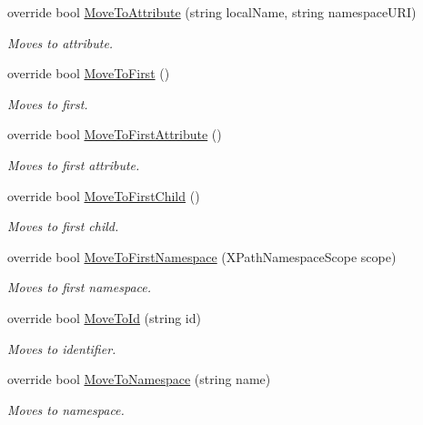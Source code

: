 \begin{DoxyCompactItemize}
override bool \hyperlink{class_html_agility_pack_1_1_html_node_navigator_a6b7fc67311c2ac265885e54c5635541f}{Move\+To\+Attribute} (string local\+Name, string namespace\+U\+RI)
\begin{DoxyCompactList}\small\item\em Moves to attribute. \end{DoxyCompactList}\item 
override bool \hyperlink{class_html_agility_pack_1_1_html_node_navigator_a526c05386cfddeaa487a0faec47b7249}{Move\+To\+First} ()
\begin{DoxyCompactList}\small\item\em Moves to first. \end{DoxyCompactList}\item 
override bool \hyperlink{class_html_agility_pack_1_1_html_node_navigator_a6ccb3234a1eb952d67f616228d27dd12}{Move\+To\+First\+Attribute} ()
\begin{DoxyCompactList}\small\item\em Moves to first attribute. \end{DoxyCompactList}\item 
override bool \hyperlink{class_html_agility_pack_1_1_html_node_navigator_a4ca4c49ada01e73a3ad6a5344d73e6f2}{Move\+To\+First\+Child} ()
\begin{DoxyCompactList}\small\item\em Moves to first child. \end{DoxyCompactList}\item 
override bool \hyperlink{class_html_agility_pack_1_1_html_node_navigator_aa2e0f478c95ac0b68f0f4c0143a999a7}{Move\+To\+First\+Namespace} (X\+Path\+Namespace\+Scope scope)
\begin{DoxyCompactList}\small\item\em Moves to first namespace. \end{DoxyCompactList}\item 
override bool \hyperlink{class_html_agility_pack_1_1_html_node_navigator_a5b647847ecfcedf5701785b1d8263155}{Move\+To\+Id} (string id)
\begin{DoxyCompactList}\small\item\em Moves to identifier. \end{DoxyCompactList}\item 
override bool \hyperlink{class_html_agility_pack_1_1_html_node_navigator_ab7a996c7b03fba88e8c3be79e89bb4aa}{Move\+To\+Namespace} (string name)
\begin{DoxyCompactList}\small\item\em Moves to namespace. \end{DoxyCompactList}\item 

\end{DoxyCompactItemize}
